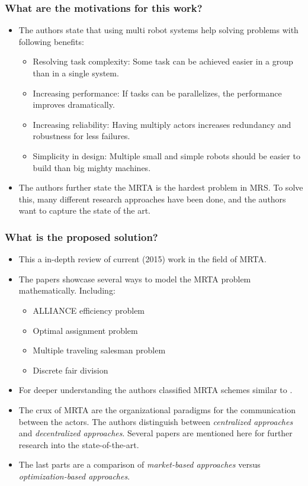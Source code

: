     \subsubsection*{What are the motivations for this work?}
    \begin{itemize}
        \item The authors state that using multi robot systems help solving problems with following benefits: \ \begin{itemize}
            \item Resolving task complexity: Some task can be achieved easier in a group than in a single system.
            \item Increasing performance: If tasks can be parallelizes, the performance improves dramatically.
            \item Increasing reliability: Having multiply actors increases redundancy and robustness for less failures.
            \item Simplicity in design: Multiple small and simple robots should be easier to build than big mighty machines.
        \end{itemize}
        \item The authors further state the MRTA is the hardest problem in MRS. To solve this, many different research approaches have been done, and the authors want to capture the state of the art.
    \end{itemize}
    
    \subsubsection*{What is the proposed solution?}
    \begin{itemize}
        \item This a in-depth review of current (2015) work in the field of MRTA. 
        \item The papers showcase several ways to model the MRTA problem mathematically. Including: \begin{itemize}
            \item ALLIANCE efficiency problem
            \item Optimal assignment problem
            \item Multiple traveling salesman problem
            \item Discrete fair division
        \end{itemize}
        \item For deeper understanding the authors classified MRTA schemes similar to \cite{Gerkey2004}.
        \item The crux of MRTA are the organizational paradigms for the communication between the actors. The authors distinguish between \emph{centralized approaches} and \emph{decentralized approaches}. Several papers are mentioned here for further research into the state-of-the-art.
    \item The last parts are a comparison of \emph{market-based approaches} versus \emph{optimization-based approaches}. 
    \end{itemize}
